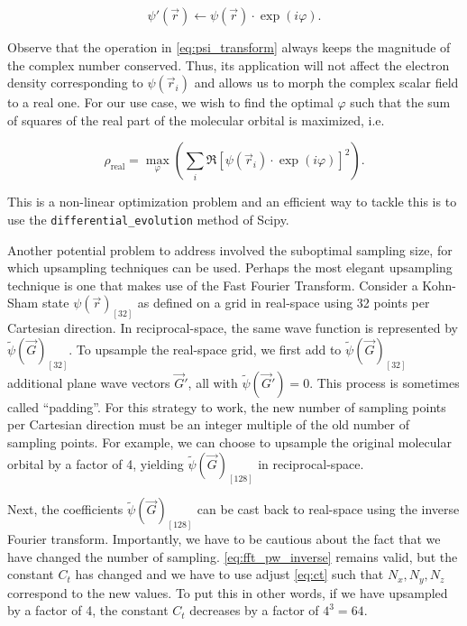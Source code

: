 \begin{equation}
    \psi\prime(\vec{r}) \leftarrow \psi(\vec{r}) \cdot \exp \left(i \varphi \right).
    \label{eq:psi_transform}
\end{equation}

Observe that the operation in \cref{eq:psi_transform} always keeps the magnitude of the complex number conserved. Thus, its application will not affect the electron density corresponding to $\psi(\vec{r}_{i})$ and allows us to morph the complex scalar field to a real one. For our use case, we wish to find the optimal $\varphi$ such that the sum of squares of the real part of the molecular orbital is maximized, i.e.

\begin{equation}
    \rho_{\text{real}} = \max_\varphi \left(\sum_{i}\mathfrak{R}\left[ \psi(\vec{r}_{i}) \cdot \exp \left(i \varphi \right)\right]^{2} \right).
    \label{eq:optimize_real}
\end{equation}

This is a non-linear optimization problem and an efficient way to tackle this is to use the \texttt{differential\_evolution} method of Scipy.\cite{differential_evolution}

Another potential problem to address involved the suboptimal sampling size, for which upsampling techniques can be used. Perhaps the most elegant upsampling technique is one that makes use of the Fast Fourier Transform. Consider a Kohn-Sham state $\psi(\vec{r})_{[32]}$ as defined on a grid in real-space using 32 points per Cartesian direction. In reciprocal-space, the same wave function is represented by $\tilde{\psi}(\vec{G})_{[32]}$. To upsample the real-space grid, we first add to $\tilde{\psi}(\vec{G})_{[32]}$ additional plane wave vectors $\vec{G}\prime$, all with $\tilde{\psi}(\vec{G}\prime) = 0$. This process is sometimes called ``padding''. For this strategy to work, the new number of sampling points per Cartesian direction must be an integer multiple of the old number of sampling points. For example, we can choose to upsample the original molecular orbital by a factor of 4, yielding $\tilde{\psi}(\vec{G})_{[128]}$ in reciprocal-space.

Next, the coefficients $\tilde{\psi}(\vec{G})_{[128]}$ can be cast back to real-space using the inverse Fourier transform. Importantly, we have to be cautious about the fact that we have changed the number of sampling. \cref{eq:fft_pw_inverse} remains valid, but the constant $C_{t}$ has changed and we have to use adjust \cref{eq:ct} such that $N_{x},N_{y},N_{z}$ correspond to the new values. To put this in other words, if we have upsampled by a factor of 4, the constant $C_{t}$ decreases by a factor of $4^{3}=64$.

